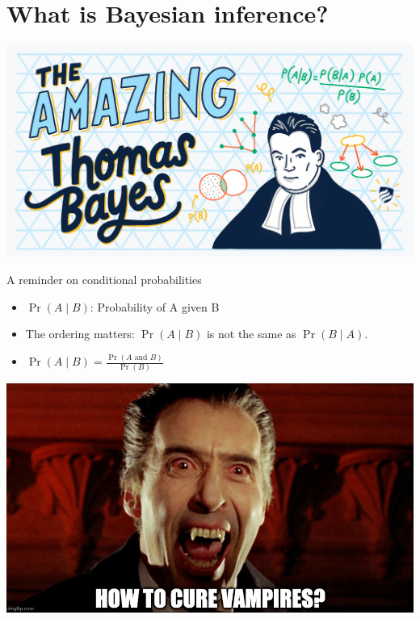 \documentclass[
  ignorenonframetext,
  aspectratio=169]{beamer}
\providecommand{\tightlist}{%
  \setlength{\itemsep}{0pt}\setlength{\parskip}{0pt}}
\begin{document}
\hypertarget{what-is-bayesian-inference}{%
\section{What is Bayesian inference?}\label{what-is-bayesian-inference}}

\begin{frame}
\includegraphics{img/amazing-thomas-bayes-illustration.jpg}
\end{frame}

\begin{frame}{A reminder on conditional probabilities}
\protect\hypertarget{a-reminder-on-conditional-probabilities}{}
\begin{itemize}[<+->]
\tightlist
\item
  \(\Pr(A \mid B)\): Probability of A given B
\end{itemize}

\begin{itemize}[<+->]
\tightlist
\item
  The ordering matters: \(\Pr(A \mid B)\) is not the same as
  \(\Pr(B \mid A)\).
\end{itemize}

\begin{itemize}[<+->]
\tightlist
\item
  \(\Pr(A \mid B) = \displaystyle{\frac{\Pr(A \text{ and } B)}{\Pr(B)}}\)
\end{itemize}
\end{frame}

\begin{frame}
\includegraphics{img/how_to_cure_vampires.jpg}
\end{frame}
\end{document}
